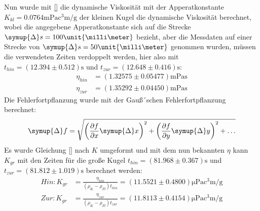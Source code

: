 Nun wurde mit \eqref{} die dynamische Viskosität mit der Apperatkonstante $K_{kl} = 0.0764\unit{\milli\pascal\cubic\centi\meter\per\gram}$
der kleinen Kugel die dynamische Viskosität berechnet, wobei die angegebene Apperatkonstante sich auf die Strecke
$\symup{\Delta}s = 100\unit{\milli\meter}$ bezieht, aber die Messdaten auf einer Strecke von $\symup{\Delta}s = 50\unit{\milli\meter}$ genommen wurden,
müssen die verwendeten Zeiten verdoppelt werden, hier also mit $t_{hin} = (12.394\pm 0.512)\unit{\second}$ und $t_{zur} = (12.648\pm 0.416)\unit{\second}$:
\begin{align*}
  \eta_{hin} &= (1.32575\pm 0.05477)\unit{\milli\pascal\second}\\
  \eta_{zur} &= (1.35292\pm 0.04450)\unit{\milli\pascal\second}
\end{align*}
Die Fehlerfortpflanzung wurde mit der Gauß´schen Fehlerfortpflanzung berechnet:
\begin{equation*}
  \symup{\Delta}f = \sqrt{\left(\frac{\partial f}{\partial x}\symup{\Delta}x\right)^2 + \left(\frac{\partial f}{\partial y}\symup{\Delta}y\right)^2 +\ldots}
\end{equation*}
Es wurde Gleichung \eqref{} nach $K$ umgeformt und mit dem nun bekannten $\eta$ kann $K_{gr}$ mit
den Zeiten für die große Kugel $t_{hin} = (81.968\pm 0.367)\unit{\second}$ und $t_{zur} = (81.812\pm 1.019)\unit{\second}$ berechnet werden:
\begin{align*}
  Hin : K_{gr} &= \frac{\eta_{hin}}{(\rho_K-\rho_{Fl})t_{hin}} = (11.5521\pm 0.4800)\unit{\micro\pascal\cubic\centi\meter\per\gram}\\
  Zur : K_{gr} &= \frac{\eta_{zur}}{(\rho_K-\rho_{Fl})t_{zur}} = (11.8113\pm 0.4154)\unit{\micro\pascal\cubic\centi\meter\per\gram}
\end{align*}